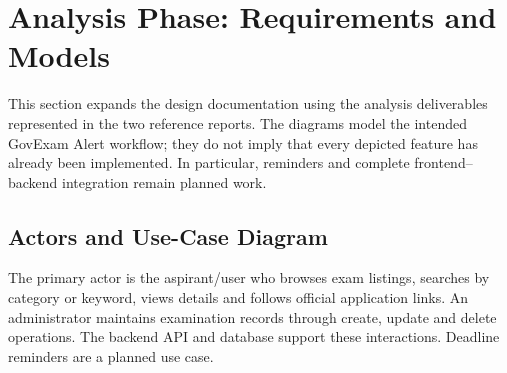 \documentclass[12pt,a4paper]{report}
\begin{document}
\section{Analysis Phase: Requirements and Models}
This section expands the design documentation using the analysis deliverables represented in the two reference reports. The diagrams model the intended GovExam Alert workflow; they do not imply that every depicted feature has already been implemented. In particular, reminders and complete frontend--backend integration remain planned work.

\subsection{Actors and Use-Case Diagram}
The primary actor is the aspirant/user who browses exam listings, searches by category or keyword, views details and follows official application links. An administrator maintains examination records through create, update and delete operations. The backend API and database support these interactions. Deadline reminders are a planned use case.
\end{document}
